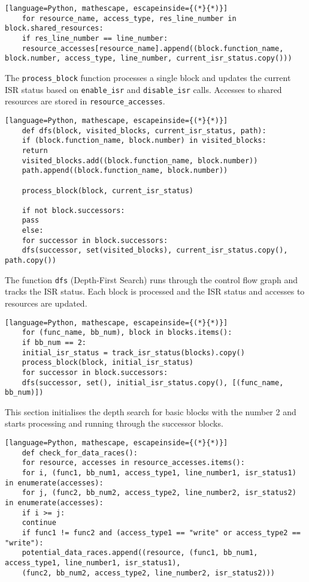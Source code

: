 \documentclass[
fancyheadings, %
%
%
]{stsreprt}
\begin{document}
{\begin{lstlisting}[language=Python, mathescape, escapeinside={(*}{*)}]
	for resource_name, access_type, res_line_number in block.shared_resources:
	if res_line_number == line_number:
	resource_accesses[resource_name].append((block.function_name, block.number, access_type, line_number, current_isr_status.copy()))
\end{lstlisting}

The \texttt{process\_block} function processes a single block and updates the current ISR status based on \texttt{enable\_isr} and \texttt{disable\_isr} calls. Accesses to shared resources are stored in \texttt{resource\_accesses}.

\begin{lstlisting}[language=Python, mathescape, escapeinside={(*}{*)}]
	def dfs(block, visited_blocks, current_isr_status, path):
	if (block.function_name, block.number) in visited_blocks:
	return
	visited_blocks.add((block.function_name, block.number))
	path.append((block.function_name, block.number))
	
	process_block(block, current_isr_status)
	
	if not block.successors:
	pass
	else:
	for successor in block.successors:
	dfs(successor, set(visited_blocks), current_isr_status.copy(), path.copy())
\end{lstlisting}

The function \texttt{dfs} (Depth-First Search) runs through the control flow graph and tracks the ISR status. Each block is processed and the ISR status and accesses to resources are updated.

\begin{lstlisting}[language=Python, mathescape, escapeinside={(*}{*)}]
	for (func_name, bb_num), block in blocks.items():
	if bb_num == 2:  
	initial_isr_status = track_isr_status(blocks).copy()
	process_block(block, initial_isr_status)
	for successor in block.successors:
	dfs(successor, set(), initial_isr_status.copy(), [(func_name, bb_num)])
\end{lstlisting}

This section initialises the depth search for basic blocks with the number 2 and starts processing and running through the successor blocks.

\begin{lstlisting}[language=Python, mathescape, escapeinside={(*}{*)}]
	def check_for_data_races():
	for resource, accesses in resource_accesses.items():
	for i, (func1, bb_num1, access_type1, line_number1, isr_status1) in enumerate(accesses):
	for j, (func2, bb_num2, access_type2, line_number2, isr_status2) in enumerate(accesses):
	if i >= j:
	continue  
	if func1 != func2 and (access_type1 == "write" or access_type2 == "write"):
	potential_data_races.append((resource, (func1, bb_num1, access_type1, line_number1, isr_status1),
	(func2, bb_num2, access_type2, line_number2, isr_status2)))
\end{lstlisting}

}
\end{document}

